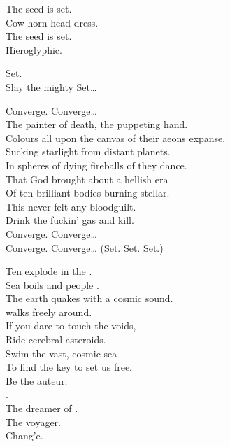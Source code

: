 The seed is set. \\
Cow-horn head-dress. \\
The seed is set. \\
Hieroglyphic. \\


Set. \\
Slay the mighty Set… \\


Converge. Converge… \\

The painter of death, the puppeting hand. \\
Colours all upon the canvas of their aeons expanse. \\
Sucking starlight from distant planets. \\
In spheres of dying fireballs of  they dance. \\

That God brought about a hellish era\\
Of ten brilliant bodies burning stellar. \\
This  never felt any bloodguilt. \\
Drink the fuckin' gas and kill. \\

Converge. Converge… \\
Converge. Converge… (Set. Set. Set.) \\




Ten  explode in the . \\
Sea boils and people . \\
The earth quakes with a cosmic sound. \\
 walks freely around. \\
If you dare to touch the voids, \\
Ride cerebral asteroids. \\
Swim the vast, cosmic sea \\
To find the key to set us free. \\

Be the auteur. \\
. \\
The dreamer of . \\
The voyager. \\
Chang'e. \\

